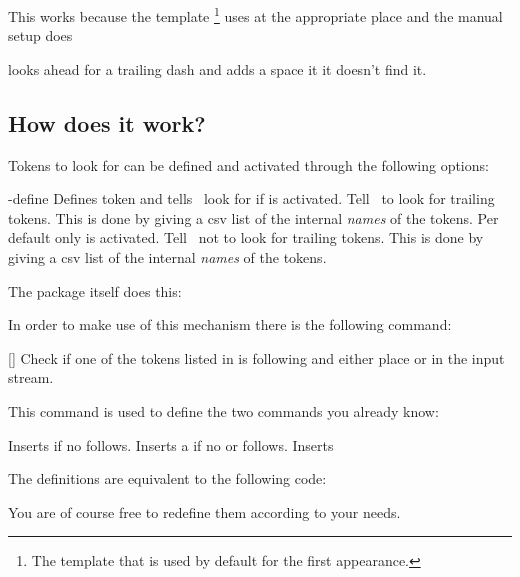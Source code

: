 \documentclass{acro-manual}
\begin{document}
This works because the template \footnote{The template that
  is used by default for the first appearance.} uses  at the
appropriate place and the manual setup does
\begin{sourcecode}
\end{sourcecode}
 looks ahead for a trailing dash and adds a space it it doesn't
find it.

\subsection{How does it work?}
Tokens to look for can be defined and activated through the following options:
\begin{options}
  \keylit-{define}{}
    Defines token  and tells \acro\ look for  if
     is activated.
    Tell \acro\ to look for trailing tokens.  This is done by giving a csv
    list of the internal \emph{names} of the tokens.  Per default only
     is activated.
    Tell \acro\ not to look for trailing tokens.  This is done by giving a csv
    list of the internal \emph{names} of the tokens.
\end{options}
The package itself does this:
\begin{sourcecode}
\end{sourcecode}

In order to make use of this mechanism there is the following command:
\begin{commands}
  \expandable{}[]
    Check if one of the tokens listed in  is
    following and either place  or  in the input
    stream.
\end{commands}
This command is used to define the two commands you already know:
\begin{commands}
  \expandable{} Inserts  if no  follows.
  \expandable{} Inserts a  if no  or
     follows.
  \expandable{} Inserts 
\end{commands}
The definitions are equivalent to the following code:
\begin{sourcecode}
  \newcommand*\acdot{\aciftrailing{dot}{}{\abbrdot}}
  \newcommand*\acspace{\aciftrailing{dash,babel-hyphen}{}{\space}}
\end{sourcecode}
You are of course free to redefine them according to your needs.
\end{document}
